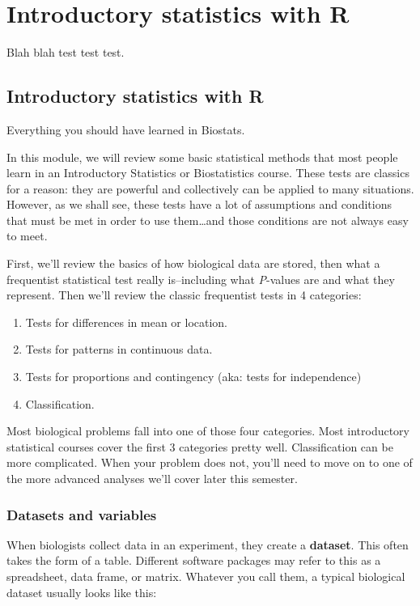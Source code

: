 \documentclass[
  13,
  letterpaper,
]{report}
\begin{document}
\part{Introductory statistics with R}

Blah blah test test test.

\chapter{Introductory statistics with R}\label{sec-review}

Everything you should have learned in Biostats.

In this module, we will review some basic statistical methods that most
people learn in an Introductory Statistics or Biostatistics course.
These tests are classics for a reason: they are powerful and
collectively can be applied to many situations. However, as we shall
see, these tests have a lot of assumptions and conditions that must be
met in order to use them\ldots and those conditions are not always easy
to meet.

First, we'll review the basics of how biological data are stored, then
what a frequentist statistical test really is--including what
\emph{P}-values are and what they represent. Then we'll review the
classic frequentist tests in 4 categories:

\begin{enumerate}
\def\labelenumi{\arabic{enumi}.}
\item
  Tests for differences in mean or location.
\item
  Tests for patterns in continuous data.
\item
  Tests for proportions and contingency (aka: tests for independence)
\item
  Classification.
\end{enumerate}

Most biological problems fall into one of those four categories. Most
introductory statistical courses cover the first 3 categories pretty
well. Classification can be more complicated. When your problem does
not, you'll need to move on to one of the more advanced analyses we'll
cover later this semester.

\section{Datasets and variables}\label{mod-09-datasets}

When biologists collect data in an experiment, they create a
\textbf{dataset}. This often takes the form of a table. Different
software packages may refer to this as a spreadsheet, data frame, or
matrix. Whatever you call them, a typical biological dataset usually
looks like this:
\end{document}
